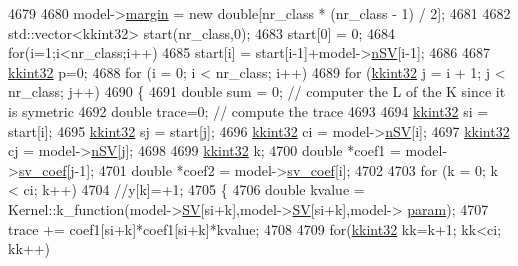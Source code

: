 \begin{DoxyCode}
4679 
4680     model->\hyperlink{struct_s_v_m233_1_1_svm_model233_a6a178965d1c6ebccdf51af3fc7486d46}{margin} = \textcolor{keyword}{new} \textcolor{keywordtype}{double}[nr\_class * (nr\_class - 1) / 2];
4681 
4682     std::vector<kkint32> start(nr\_class,0);
4683     start[0] = 0;
4684     \textcolor{keywordflow}{for}(i=1;i<nr\_class;i++)
4685       start[i] = start[i-1]+model->\hyperlink{struct_s_v_m233_1_1_svm_model233_a4f2e1cae54d713246c1c7b63a5b30136}{nSV}[i-1];
4686 
4687     \hyperlink{namespace_k_k_b_a8fa4952cc84fda1de4bec1fbdd8d5b1b}{kkint32} p=0;
4688     for  (i = 0;  i < nr\_class;  i++)
4689       \textcolor{keywordflow}{for}  (\hyperlink{namespace_k_k_b_a8fa4952cc84fda1de4bec1fbdd8d5b1b}{kkint32} j = i + 1;  j < nr\_class;  j++)
4690       \{
4691         \textcolor{keywordtype}{double} sum = 0; \textcolor{comment}{// computer the L of the K since it is symetric}
4692         \textcolor{keywordtype}{double} trace=0; \textcolor{comment}{// compute the trace}
4693 
4694         \hyperlink{namespace_k_k_b_a8fa4952cc84fda1de4bec1fbdd8d5b1b}{kkint32} si = start[i];
4695         \hyperlink{namespace_k_k_b_a8fa4952cc84fda1de4bec1fbdd8d5b1b}{kkint32} sj = start[j];
4696         \hyperlink{namespace_k_k_b_a8fa4952cc84fda1de4bec1fbdd8d5b1b}{kkint32} ci = model->\hyperlink{struct_s_v_m233_1_1_svm_model233_a4f2e1cae54d713246c1c7b63a5b30136}{nSV}[i];
4697         \hyperlink{namespace_k_k_b_a8fa4952cc84fda1de4bec1fbdd8d5b1b}{kkint32} cj = model->\hyperlink{struct_s_v_m233_1_1_svm_model233_a4f2e1cae54d713246c1c7b63a5b30136}{nSV}[j];
4698 
4699         \hyperlink{namespace_k_k_b_a8fa4952cc84fda1de4bec1fbdd8d5b1b}{kkint32} k;
4700         \textcolor{keywordtype}{double} *coef1 = model->\hyperlink{struct_s_v_m233_1_1_svm_model233_ac60e898fcd1028cc699269ef5995df06}{sv\_coef}[j-1];
4701         \textcolor{keywordtype}{double} *coef2 = model->\hyperlink{struct_s_v_m233_1_1_svm_model233_ac60e898fcd1028cc699269ef5995df06}{sv\_coef}[i];
4702 
4703         \textcolor{keywordflow}{for}  (k = 0;  k < ci;  k++)
4704           \textcolor{comment}{//y[k]=+1;}
4705         \{
4706           \textcolor{keywordtype}{double} kvalue = Kernel::k\_function(model->\hyperlink{struct_s_v_m233_1_1_svm_model233_a97dd1118f0bf7803ad6f4d952a56d06b}{SV}[si+k],model->\hyperlink{struct_s_v_m233_1_1_svm_model233_a97dd1118f0bf7803ad6f4d952a56d06b}{SV}[si+k],model->
      \hyperlink{struct_s_v_m233_1_1_svm_model233_aea9d5d416f02777981c7677da2044571}{param});
4707           trace += coef1[si+k]*coef1[si+k]*kvalue;
4708 
4709           \textcolor{keywordflow}{for}(\hyperlink{namespace_k_k_b_a8fa4952cc84fda1de4bec1fbdd8d5b1b}{kkint32} kk=k+1; kk<ci; kk++)

\end{DoxyCode}
